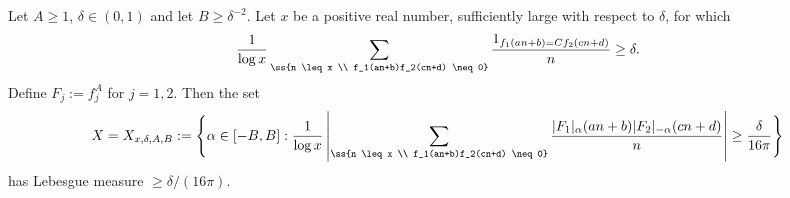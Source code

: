 \begin{lem}\label{lem:toBinCorrelft}
Let $A \geq 1$, $\delta \in (0,1)$ and let $B\geq \delta^{-2}$. Let $x$ be a positive real number, sufficiently large with respect to $\delta$, for which
\begin{equation}\label{eq:EqualCond}
\frac{1}{\log x} \sum_{\ss{n \leq x \\ f_1(an+b)f_2(cn+d) \neq 0}} \frac{1_{f_1(an+b) = Cf_2(cn+d)}}{n} \geq \delta.
\end{equation}
Define $F_j := f_j^A$ for $j = 1,2$. Then the set
\begin{equation}\label{eq:largeCorrelft}
X = X_{x,\delta,A,B} := \Bigg\{\alpha \in [-B,B] : \frac{1}{\log x} \left|\sum_{\ss{n \leq x \\ f_1(an+b)f_2(cn+d) \neq 0}} \frac{|F_1|_{\alpha}(an+b)|F_2|_{-\alpha}(cn+d)}{n}\right| \geq \frac{\delta}{16\pi} \Bigg\}
\end{equation}
has Lebesgue measure $\geq \delta/(16\pi)$.
\end{lem}
